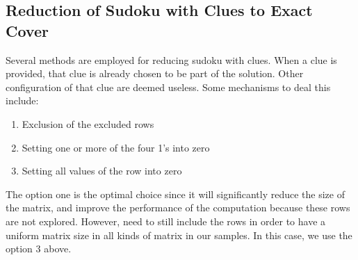 \documentclass[a4paper,oneside,11pt]{report}
\newcounter{row}
\begin{document}
\subsection{Reduction of Sudoku with Clues to Exact Cover}
Several methods are employed for reducing sudoku with clues. When a clue is provided, that clue is already chosen to be part of the solution. Other configuration of that clue are deemed useless. Some mechanisms to deal this include:
\begin{enumerate}
\item Exclusion of the excluded rows
\item Setting one or more of the four 1’s into zero
\item Setting all values of the row into zero\\
\end{enumerate}

The option one is the optimal choice since it will significantly reduce the size of the matrix, and improve the performance of the computation because these rows are not explored. However,  need to still include the rows in order to have a uniform matrix size in all kinds of matrix in our samples. In this case, we use the option 3 above.\\
\end{document}
